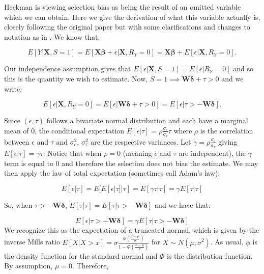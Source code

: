 \documentclass[12pt,twoside]{reedthesis}
\theoremstyle{definition}
\begin{document}
Heckman is viewing selection bias as being the result of an omitted variable which we can obtain. Here we give the derivation of what this variable actually is, closely following the original paper but with some clarifications and changes to notation as in \citep{Jin}. We know that:

$$E[Y | \mathbf{X}, S = 1] = E[ \mathbf{X} \boldsymbol{\beta} + \epsilon | \mathbf{X}, R_Y = 0] = \mathbf{X} \boldsymbol{\beta} + E[\epsilon |  \mathbf{X}, R_Y = 0].$$

Our independence assumption gives that $ E[\epsilon |  \mathbf{X}, S = 1] =  E[\epsilon |  R_Y = 0]$ and so this is the quantity we wish to estimate. Now, $S=1 \implies  \mathbf{W} \boldsymbol{\delta} + \tau > 0$ and we write:  

$$E[\epsilon |  \mathbf{X}, R_Y = 0 ] = E[\epsilon | \mathbf{W} \boldsymbol{\delta}+ \tau > 0] = E[\epsilon |  \tau > - \mathbf{W} \boldsymbol{\delta}].$$

Since $(\epsilon, \tau)$ follows a bivariate normal distribution and each have a marginal mean of $0$, the conditional expectation $E[\epsilon | \tau] = \rho \frac{\sigma_{\epsilon}}{\sigma_{\tau}} \tau$ where $\rho$ is the correlation between $\epsilon$ and $\tau$ and $\sigma^2_{\epsilon}$, $\sigma^2_{\tau}$ are the respective variances. Let $\gamma  = \rho \frac{\sigma_{\epsilon}}{\sigma_{\tau}}$ giving $E[\epsilon | \tau] = \gamma \tau$. Notice that when $\rho = 0$ (meaning $\epsilon$ and $\tau$ are independent), the $\gamma$ term is equal to $0$ and therefore the selection does not bias the estimate.  We may then apply the law of total expectation (sometimes call Adam's law):

$$E[\epsilon | \tau] = E[E[\epsilon | \tau] | \tau] = E[\gamma \tau | \tau] = \gamma E[\tau | \tau]$$	

So, when $\tau > - \mathbf{W} \boldsymbol{\delta}$, $E[\tau | \tau] = E[\tau | \tau > - \mathbf{W} \boldsymbol{\delta}]$ and we have that:

$$E[\epsilon | \tau >  - \mathbf{W} \boldsymbol{\delta}]  = \gamma E[ \tau | \tau >   - \mathbf{W} \boldsymbol{\delta}]$$																																																												
We recognize this as the expectation of a truncated normal, which is given by the inverse Mills ratio $E[X | X > x] = \sigma \frac{\phi(\frac{x- \mu}{\sigma})}{1 - \Phi(\frac{x - \mu}{\sigma})}$ for $X \sim N(\mu, \sigma^2)$. As usual, $\phi$ is the density function for the standard normal and $\Phi$ is the distribution function. By assumption, $\mu = 0$. Therefore,						
\end{document}
